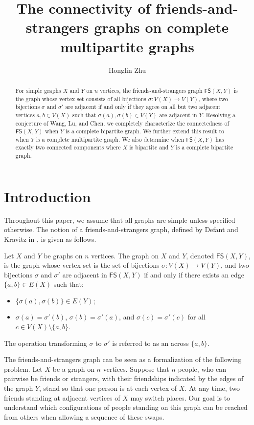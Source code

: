 \documentclass{mystyle}
\title[Friends-and-strangers graphs on complete multipartite graphs]{The connectivity of friends-and-strangers graphs on complete multipartite graphs}
\author[H. Zhu]{Honglin Zhu}
\newcommand{\FS}{\mathsf{FS}}
\begin{document}
\begin{abstract}
For simple graphs $X$ and $Y$ on $n$ vertices, the friends-and-strangers graph $\mathsf{FS}(X,Y)$ is the graph whose vertex set consists of all bijections $\sigma: V(X) \to V(Y)$, where two bijections $\sigma$ and $\sigma'$ are adjacent if and only if they agree on all but two adjacent vertices $a, b \in V(X)$ such that $\sigma(a), \sigma(b) \in V(Y)$ are adjacent in $Y$. Resolving a conjecture of Wang, Lu, and Chen, we completely characterize the connectedness of $\mathsf{FS}(X, Y)$ when $Y$ is a complete bipartite graph. We further extend this result to when $Y$ is a complete multipartite graph. We also determine when $\mathsf{FS}(X, Y)$ has exactly two connected components where $X$ is bipartite and $Y$ is a complete bipartite graph. 
\end{abstract}

\maketitle

\section{Introduction}\label{sec_intro}
Throughout this paper, we assume that all graphs are simple unless specified otherwise. The notion of a friends-and-strangers graph, defined by Defant and Kravitz in \cite{defant2021}, is given as follows.
\begin{definition}
    Let $X$ and $Y$ be graphs on $n$ vertices. The  graph on $X$ and $Y$, denoted $\FS(X, Y)$, is the graph whose vertex set is the set of bijections $\sigma: V(X) \to V(Y)$, and two bijections $\sigma$ and $\sigma'$ are adjacent in $\FS(X, Y)$ if and only if there exists an edge $\{a, b\} \in E(X)$ such that:
    \begin{itemize}
        \item $\{\sigma(a), \sigma(b)\} \in E(Y)$;
        \item $\sigma(a) = \sigma'(b)$, $\sigma(b) = \sigma'(a)$, and $\sigma(c) = \sigma'(c)$ for all $c \in V(X) \setminus \{a, b\}$.
    \end{itemize}
    The operation transforming $\sigma$ to $\sigma'$ is referred to as an  across $\{a, b\}$. 
\end{definition}

The friends-and-strangers graph can be seen as a formalization of the following problem. Let $X$ be a graph on $n$ vertices. Suppose that $n$ people, who can pairwise be friends or strangers, with their friendships indicated by the edges of the graph $Y$, stand so that one person is at each vertex of $X$. At any time, two friends standing at adjacent vertices of $X$ may switch places. Our goal is to understand which configurations of people standing on this graph can be reached from others when allowing a sequence of these swaps. 
\end{document}
